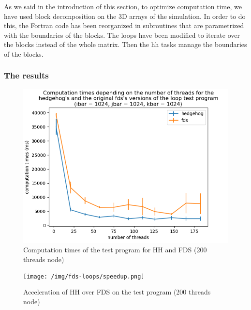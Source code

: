 As we said in the introduction of this section, to optimize computation time, we
have used block decomposition on the 3D arrays of the simulation. In order to do
this, the Fortran code has been reorganized in subroutines that are parametrized
with the boundaries of the blocks. The loops have been modified to iterate over
the blocks instead of the whole matrix. Then the \gls{hh} tasks manage the
boundaries of the blocks.


\subsubsection{The results}

\begin{figure}[h!]
  \begin{center}
    \includegraphics[scale=0.2]{img/fds-loops/times.png}
    \caption{Computation times of the test program for HH and FDS (200 threads node)}
    \label{fig:loopscomptime}
  \end{center}
\end{figure}

\begin{figure}[h!]
  \begin{center}
    \texttt{[image: /img/fds-loops/speedup.png]}
    \caption{Acceleration of HH over FDS on the test program (200 threads node)}
    \label{fig:label}
  \end{center}
\end{figure}


